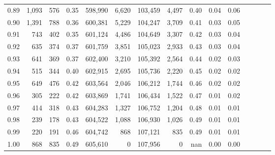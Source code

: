 \begin{tabular}{rrrcrrrrrrrrrrr}
0.89 &   1,093 &    576 &                                       0.35 &  598,990 &    6,620 &  103,459 &    4,497 &  0.40 &  0.04 &                         0.06 \\
0.90 &   1,391 &    788 &                                       0.36 &  600,381 &    5,229 &  104,247 &    3,709 &  0.41 &  0.03 &                         0.05 \\
0.91 &     743 &    402 &                                       0.35 &  601,124 &    4,486 &  104,649 &    3,307 &  0.42 &  0.03 &                         0.04 \\
0.92 &     635 &    374 &                                       0.37 &  601,759 &    3,851 &  105,023 &    2,933 &  0.43 &  0.03 &                         0.04 \\
0.93 &     641 &    369 &                                       0.37 &  602,400 &    3,210 &  105,392 &    2,564 &  0.44 &  0.02 &                         0.03 \\
0.94 &     515 &    344 &                                       0.40 &  602,915 &    2,695 &  105,736 &    2,220 &  0.45 &  0.02 &                         0.02 \\
0.95 &     649 &    476 &                                       0.42 &  603,564 &    2,046 &  106,212 &    1,744 &  0.46 &  0.02 &                         0.02 \\
0.96 &     305 &    222 &                                       0.42 &  603,869 &    1,741 &  106,434 &    1,522 &  0.47 &  0.01 &                         0.02 \\
0.97 &     414 &    318 &                                       0.43 &  604,283 &    1,327 &  106,752 &    1,204 &  0.48 &  0.01 &                         0.01 \\
0.98 &     239 &    178 &                                       0.43 &  604,522 &    1,088 &  106,930 &    1,026 &  0.49 &  0.01 &                         0.01 \\
0.99 &     220 &    191 &                                       0.46 &  604,742 &      868 &  107,121 &      835 &  0.49 &  0.01 &                         0.01 \\
1.00 &     868 &    835 &                                       0.49 &  605,610 &        0 &  107,956 &        0 &   nan &  0.00 &                         0.00 \\
\bottomrule
\end{tabular}
